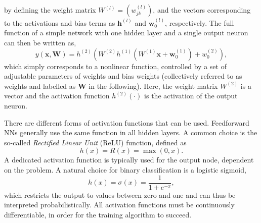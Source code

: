 by defining the weight matrix $W^{(l)} = \left(w^{(l)}_{jk} \right)$, and the vectors corresponding to the activations and bias terms as $\mathbf{h}^{(l)}$ and  $\mathbf{w}^{(l)}_0$, respectively.
The full function of a simple network with one hidden layer and a single output neuron can then be written as,
\begin{equation}
    y(\mathbf{x}, \mathbf{W}) = h^{(2)} \left( W^{(2)} h^{(1)} \left(  W^{(1)} \mathbf{x} + \mathbf{w}^{(1)}_{0}    \right) + w^{(2)}_{0} \right),
\end{equation}
which simply corresponds to a nonlinear function, controlled by a set of adjustable parameters of weights and bias weights (collectively referred to as weights and labelled as $\mathbf{W}$ in the following). Here, the weight matrix $W^{(2)}$ is a vector and the activation function $h^{(2)}(\cdot)$ is the activation of the output neuron.


There are different forms of activation functions that can be used.
Feedforward NNs generally use the same function in all hidden layers.
A common choice is the so-called \emph{Rectified Linear Unit} (ReLU) function, defined as
\begin{equation}
    {h(x)= R(x) = \max(0,x)}.    
\end{equation}
A dedicated activation function is typically used for the output node, dependent on the problem.
A natural choice for binary classification is a logistic sigmoid,
\begin{equation}
    \label{eq:logistic-sigmoid}
    h(x)= \sigma(x) = {\frac {1}{1+e^{-x}}},
\end{equation}
which restricts the output to values between zero and one and can thus be interpreted probabilistically.
All activation functions must be continuously differentiable, in order for the training algorithm to succeed.

